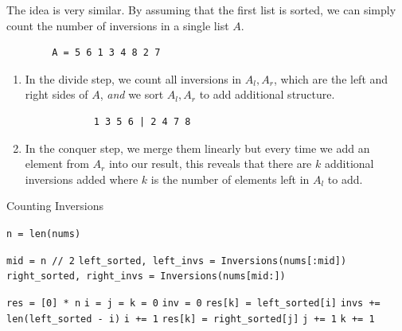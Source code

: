 \documentclass{article}
\begin{document}
    \begin{algo}
      The idea is very similar. By assuming that the first list is sorted, we can simply count the number of inversions in a single list $A$.  
      \begin{lstlisting}
        A = 5 6 1 3 4 8 2 7
      \end{lstlisting}
      \begin{enumerate}
        \item In the divide step, we count all inversions in $A_l, A_r$, which are the left and right sides of $A$, \textit{and} we sort $A_l, A_r$ to add additional structure.  
          \begin{lstlisting}
            1 3 5 6 | 2 4 7 8
          \end{lstlisting}
        \item In the conquer step, we merge them linearly but every time we add an element from $A_r$ into our result, this reveals that there are $k$ additional inversions added where $k$ is the number of elements left in $A_l$ to add.  
      \end{enumerate}
      \begin{algorithm}[H]
        \caption{Counting Inversions}
        \label{alg:inversions}
        \begin{algorithmic}
            \State \texttt{n = len(nums)}

             
              \State {}
            \EndIf
            \State \texttt{mid = n // 2} 
            \State \texttt{left\_sorted, left\_invs = Inversions(nums[:mid])} 
            \State \texttt{right\_sorted, right\_invs = Inversions(nums[mid:])} 

            \State \texttt{res = [0] * n} 
            \State \texttt{i = j = k = 0} 
            \State \texttt{inv = 0} 
             
                \State \texttt{res[k] = left\_sorted[i]} 
                \State \texttt{invs += len(left\_sorted - i)} 
                \State \texttt{i += 1} 
              \Else 
                \State \texttt{res[k] = right\_sorted[j]}
                \State \texttt{j += 1}
              \EndIf 
              \State \texttt{k += 1}
            \EndWhile


\end{algorithmic}
\end{algorithm}
\end{algo}
\end{document}
